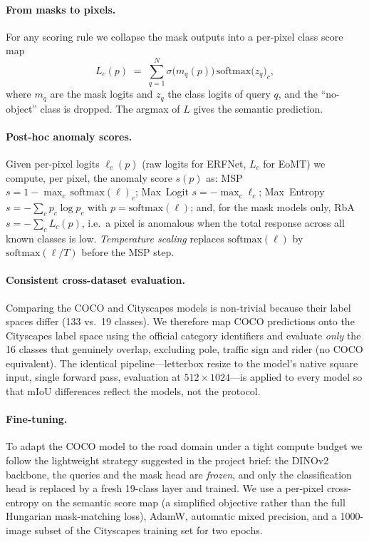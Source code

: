 \documentclass[10pt,twocolumn]{article}
\begin{document}
\paragraph{From masks to pixels.}
For any scoring rule we collapse the mask outputs into a per-pixel class score
map
\begin{equation}
L_{c}(p) \;=\; \sum_{q=1}^{N} \sigma\!\big(m_{q}(p)\big)\,
\mathrm{softmax}\!\big(z_{q}\big)_{c},
\end{equation}
where $m_q$ are the mask logits and $z_q$ the class logits of query $q$, and the
``no-object'' class is dropped. The argmax of $L$ gives the semantic
prediction.

\paragraph{Post-hoc anomaly scores.}
Given per-pixel logits $\ell_c(p)$ (raw logits for ERFNet, $L_c$ for EoMT) we
compute, per pixel, the anomaly score $s(p)$ as: MSP $s=1-\max_c\,
\mathrm{softmax}(\ell)_c$; Max~Logit $s=-\max_c \ell_c$; Max~Entropy
$s=-\sum_c p_c \log p_c$ with $p=\mathrm{softmax}(\ell)$; and, for the mask
models only, RbA $s=-\sum_c L_c(p)$, i.e.\ a pixel is anomalous when the total
response across all known classes is low. \emph{Temperature scaling} replaces
$\mathrm{softmax}(\ell)$ by $\mathrm{softmax}(\ell/T)$ before the MSP step.

\paragraph{Consistent cross-dataset evaluation.}
Comparing the COCO and Cityscapes models is non-trivial because their label
spaces differ (133 vs.\ 19 classes). We therefore map COCO predictions onto the
Cityscapes label space using the official category identifiers and evaluate
\emph{only} the 16 classes that genuinely overlap, excluding pole, traffic sign
and rider (no COCO equivalent). The identical pipeline---letterbox resize to the
model's native square input, single forward pass, evaluation at
$512\times1024$---is applied to every model so that mIoU differences reflect the
models, not the protocol.

\paragraph{Fine-tuning.}
To adapt the COCO model to the road domain under a tight compute budget we
follow the lightweight strategy suggested in the project brief: the DINOv2
backbone, the queries and the mask head are \emph{frozen}, and only the
classification head is replaced by a fresh 19-class layer and trained. We use a
per-pixel cross-entropy on the semantic score map (a simplified objective rather
than the full Hungarian mask-matching loss), AdamW, automatic mixed precision,
and a 1000-image subset of the Cityscapes training set for two epochs.
\end{document}
